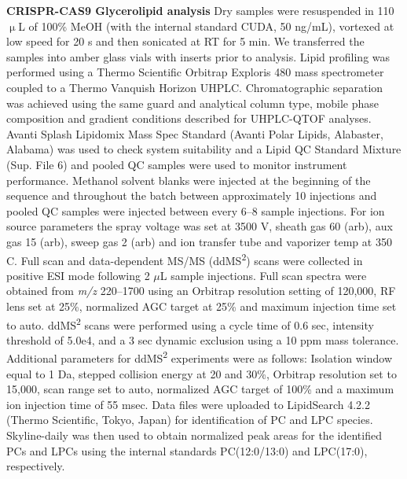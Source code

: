 \documentclass[9pt,twocolumn,twoside,lineno]{BioRxiv}
\begin{document}
\textbf{CRISPR-CAS9 Glycerolipid analysis}
Dry samples were resuspended in 110 $\upmu$L of 100\% MeOH (with the internal standard CUDA, 50 ng/mL), vortexed at low speed for 20 s and then sonicated at RT for 5 min. 
We transferred the samples into amber glass vials with inserts prior to analysis. 
Lipid profiling was performed using a Thermo Scientific Orbitrap Exploris 480 mass spectrometer coupled to a Thermo Vanquish Horizon UHPLC. 
Chromatographic separation was achieved using the same guard and analytical column type, mobile phase composition and gradient conditions described for UHPLC-QTOF analyses. 
Avanti Splash Lipidomix Mass Spec Standard (Avanti Polar Lipids, Alabaster, Alabama) was used to check system suitability and a Lipid QC Standard Mixture (Sup. File 6) and pooled QC samples were used to monitor instrument performance. 
Methanol solvent blanks were injected at the beginning of the sequence and throughout the batch between approximately 10 injections and pooled QC samples were injected between every 6–8 sample injections. 
For ion source parameters the spray voltage was set at 3500 V, sheath gas 60 (arb), aux gas 15 (arb), sweep gas 2 (arb) and ion transfer tube and vaporizer temp at 350 \degree C. 
Full scan and data-dependent MS/MS (ddMS\textsuperscript{2}) scans were collected in positive ESI mode following 2 $\mu$L sample injections. 
Full scan spectra were obtained from \textit{m/z} 220--1700 using an Orbitrap resolution setting of 120,000, RF lens set at 25\%, normalized AGC target at 25\% and maximum injection time set to auto. 
ddMS\textsuperscript{2} scans were performed using a cycle time of 0.6 sec, intensity threshold of 5.0e4, and a 3 sec dynamic exclusion using a 10 ppm mass tolerance. 
Additional parameters for ddMS\textsuperscript{2} experiments were as follows: Isolation window equal to 1 Da, stepped collision energy at 20 and 30\%, Orbitrap resolution set to 15,000, scan range set to auto, normalized AGC target of 100\% and a maximum ion injection time of 55 msec. 
Data files were uploaded to LipidSearch 4.2.2 (Thermo Scientific, Tokyo, Japan) for identification of PC and LPC species. 
Skyline-daily \cite{Adams2020-em} was then used to obtain normalized peak areas for the identified PCs and LPCs using the internal standards PC(12:0/13:0) and LPC(17:0), respectively.
\end{document}
